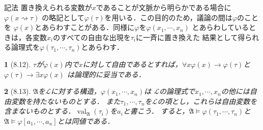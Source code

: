 \documentclass[a4j,10.5pt,oneside,openany]{jsbook}
\theoremstyle{mystyle}
\newtheorem{thm}{\color{DarkMidnightBlue}{定理}}[section]
\newcommand{\val}{\operatorname{val}} %
\begin{document}
	\begin{itembox}[l]{記法}
		置き換えられる変数が$x$であることが文脈から明らかである場合に$\varphi(x \rightsquigarrow \tau)$
		の略記として$\varphi(\tau)$を用いる．この目的のため，議論の間は$\varphi$のことを
		$\varphi(x)$とあらわすことがある．同様に$\varphi$を$\varphi(x_{1},\cdots,x_{n})$
		とあらわしているときは，各変数$x_{i}$のすべての自由な出現を$\tau_{i}$に一斉に置き換えた
		結果として得られる論理式を$\varphi(\tau_{1},\cdots,\tau_{n})$とあらわす．
	\end{itembox}
	
	\begin{screen}
		\begin{thm}[8.12]
			$\tau$が$\varphi(x)$内で$x$に対して自由であるとすれば，$\forall x \varphi(x)
			\rightarrow \varphi(\tau)$と$\varphi(\tau) \rightarrow \exists x \varphi(x)$
			は論理的に妥当である．
		\end{thm}
	\end{screen}
	
	\begin{screen}
		\begin{thm}[8.13]
			$\mathfrak{A}$を$\mathcal{L}$に対する構造，$\varphi(x_{1},\cdots,x_{n})$は
			$\mathcal{L}$の論理式で$x_{1},\cdots,x_{n}$の他には自由変数を持たないものとする．
			また$\tau_{1},\cdots,\tau_{n}$を$\mathcal{L}$の項とし，これらは自由変数を
			含まないものとする．$\val_{\mathfrak{A}}(\tau_{i})$を$a_{i}$と書こう．
			すると，$\mathfrak{A} \models \varphi(\tau_{1},\cdots,\tau_{n})$と
			$\mathfrak{A} \models \varphi[a_{1},\cdots,a_{n}]$とは同値である．
		\end{thm}
	\end{screen}
\end{document}
